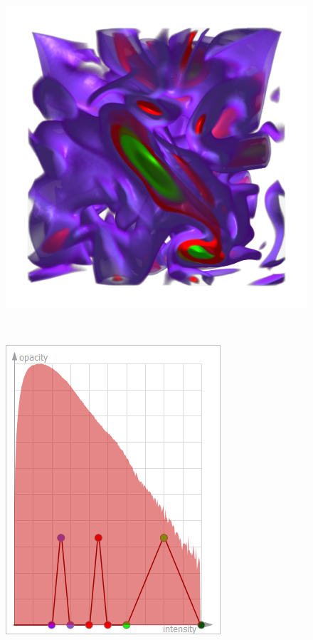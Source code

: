 \begin{figure}
	\centering
	\begin{minipage}{.29\textwidth}
		\includegraphics[width=1\linewidth]{figures/vortex_naive_proportional}
		\subcaption{}
	\end{minipage}~
	\begin{minipage}{.2\textwidth}
		\includegraphics[width=1\linewidth]{figures/tf_vortex_naive_proportional}

\end{minipage}
\end{figure}
